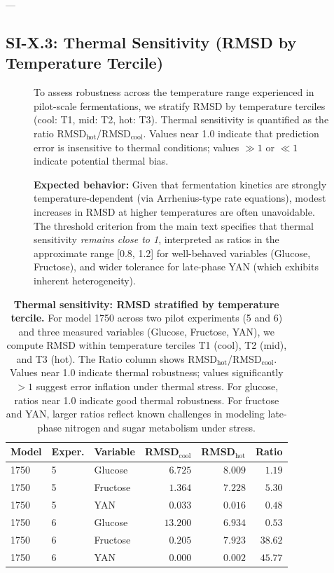 ---

\subsection{SI-X.3: Thermal Sensitivity (RMSD by Temperature Tercile)}

\begin{figure}[H]
\centering
\small
To assess robustness across the temperature range experienced in pilot-scale fermentations, 
we stratify RMSD by temperature terciles (cool: T1, mid: T2, hot: T3). Thermal sensitivity 
is quantified as the ratio RMSD$_{\mathrm{hot}}$/RMSD$_{\mathrm{cool}}$. Values near 1.0 
indicate that prediction error is insensitive to thermal conditions; values $\gg 1$ or 
$\ll 1$ indicate potential thermal bias.

\textbf{Expected behavior:} 
Given that fermentation kinetics are strongly temperature-dependent (via Arrhenius-type 
rate equations), modest increases in RMSD at higher temperatures are often unavoidable. 
The threshold criterion from the main text specifies that thermal sensitivity \emph{remains 
close to 1}, interpreted as ratios in the approximate range [0.8, 1.2] for well-behaved 
variables (Glucose, Fructose), and wider tolerance for late-phase YAN (which exhibits 
inherent heterogeneity).
\end{figure}

\begin{table}[H]\centering
\caption{\textbf{Thermal sensitivity: RMSD stratified by temperature tercile.} 
For model 1750 across two pilot experiments (5 and 6) and three measured variables 
(Glucose, Fructose, YAN), we compute RMSD within temperature terciles T1 (cool), 
T2 (mid), and T3 (hot). The Ratio column shows RMSD$_{\mathrm{hot}}$/RMSD$_{\mathrm{cool}}$. 
Values near 1.0 indicate thermal robustness; values significantly $> 1$ suggest error 
inflation under thermal stress. For glucose, ratios near 1.0 indicate good thermal robustness. 
For fructose and YAN, larger ratios reflect known challenges in modeling late-phase nitrogen 
and sugar metabolism under stress.}
\label{tab:SI_X_3_thermal_sensitivity}
\small
\begin{tabular}{lllrrr}
\toprule
\textbf{Model} & \textbf{Exper.} & \textbf{Variable} & 
\textbf{RMSD$_{\mathrm{cool}}$} & \textbf{RMSD$_{\mathrm{hot}}$} & \textbf{Ratio} \\
\midrule
1750 & 5 & Glucose & $6.725$ & $8.009$ & $1.19$ \\
1750 & 5 & Fructose & $1.364$ & $7.228$ & $5.30$ \\
1750 & 5 & YAN & $0.033$ & $0.016$ & $0.48$ \\
1750 & 6 & Glucose & $13.200$ & $6.934$ & $0.53$ \\
1750 & 6 & Fructose & $0.205$ & $7.923$ & $38.62$ \\
1750 & 6 & YAN & $0.000$ & $0.002$ & $45.77$ \\
\bottomrule
\end{tabular}
\end{table}

